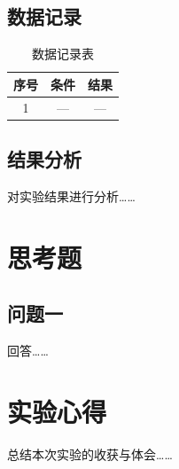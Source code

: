 \documentclass[UTF8,a4paper,12pt]{ctexart}
\begin{document}
\subsection{数据记录}

\begin{table}[htbp]
  \centering
  \caption{数据记录表}
  \begin{tabular}{|c|c|c|}
    \hline
    序号 & 条件 & 结果 \\
    \hline
    1 & — & — \\
    \hline
  \end{tabular}
\end{table}

\subsection{结果分析}

对实验结果进行分析……

\section{思考题}

\subsection{问题一}

回答……

\section{实验心得}

总结本次实验的收获与体会……
\end{document}
